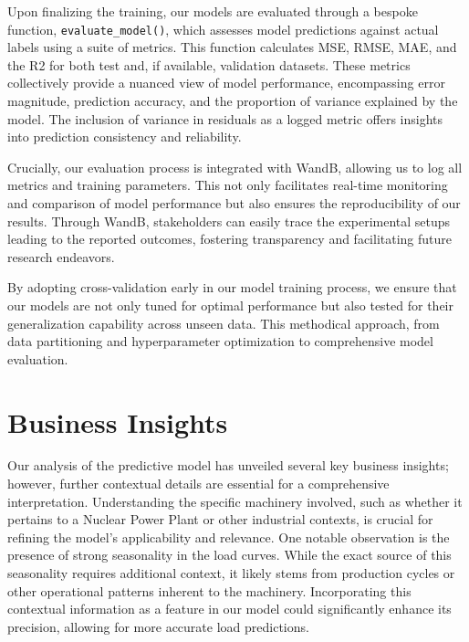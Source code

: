 \documentclass{article} %
\begin{document}
Upon finalizing the training, our models are evaluated through a bespoke function, \texttt{evaluate\_model()}, which assesses model predictions against actual labels using a suite of metrics. This function calculates \gls*{MSE}, \gls*{RMSE}, \gls*{MAE}, and the \gls*{R2} for both test and, if available, validation datasets. These metrics collectively provide a nuanced view of model performance, encompassing error magnitude, prediction accuracy, and the proportion of variance explained by the model. The inclusion of variance in residuals as a logged metric offers insights into prediction consistency and reliability. 

Crucially, our evaluation process is integrated with \gls*{WandB}, allowing us to log all metrics and training parameters. This not only facilitates real-time monitoring and comparison of model performance but also ensures the reproducibility of our results. Through \gls*{WandB}, stakeholders can easily trace the experimental setups leading to the reported outcomes, fostering transparency and facilitating future research endeavors. 

By adopting cross-validation early in our model training process, we ensure that our models are not only tuned for optimal performance but also tested for their generalization capability across unseen data. This methodical approach, from data partitioning and hyperparameter optimization to comprehensive model evaluation. 

\section{Business Insights}
Our analysis of the predictive model has unveiled several key business insights; however, further contextual details are essential for a comprehensive interpretation. Understanding the specific machinery involved, such as whether it pertains to a Nuclear Power Plant or other industrial contexts, is crucial for refining the model's applicability and relevance. One notable observation is the presence of strong seasonality in the load curves. While the exact source of this seasonality requires additional context, it likely stems from production cycles or other operational patterns inherent to the machinery. Incorporating this contextual information as a feature in our model could significantly enhance its precision, allowing for more accurate load predictions.
\end{document}
